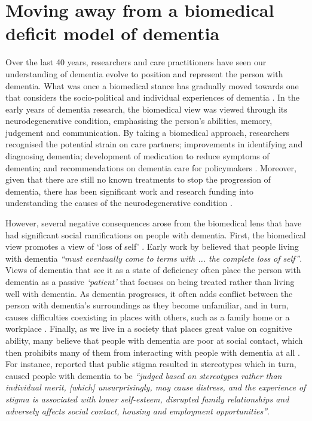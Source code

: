 \section{Moving away from a biomedical deficit model of dementia}
\label{BL:DementiaHCI}
Over the last 40 years, researchers and care practitioners have seen our understanding of dementia evolve to position and represent the person with dementia. What was once a biomedical stance has gradually moved towards one that considers the socio-political and individual experiences of dementia \citep{bellass_broadening_2019}. In the early years of dementia research, the biomedical view was viewed through its neurodegenerative condition, emphasising the person's abilities, memory, judgement and communication. By taking a biomedical approach, researchers recognised the potential strain on care partners; improvements in identifying and diagnosing dementia; development of medication to reduce symptoms of dementia; and recommendations on dementia care for policymakers \citep{doi:10.1080/13607863.2019.1693968}. Moreover, given that there are still no known treatments to stop the progression of dementia, there has been significant work and research funding into understanding the causes of the neurodegenerative condition \citep{bature_signs_2017}.

However, several negative consequences arose from the biomedical lens that have had significant social ramifications on people with dementia. First, the biomedical view promotes a view of `loss of self' \citep{ryan_dementia_2009}. Early work by \cite{cohen_loss_1986} believed that people living with dementia \textit{``must eventually come to terms with ... the complete loss of self''}. Views of dementia that see it as a state of deficiency often place the person with dementia as a passive \textit{`patient'} that focuses on being treated rather than living well with dementia. As dementia progresses, it often adds conflict between the person with dementia's surroundings as they become unfamiliar, and in turn, causes difficulties coexisting in places with others, such as a family home or a workplace \citep{langdon_making_2007}. Finally, as we live in a society that places great value on cognitive ability, many believe that people with dementia are poor at social contact, which then prohibits many of them from interacting with people with dementia at all \citep{killick_communication_2001}. For instance, \cite{mukadam2012reducing} reported that public stigma resulted in stereotypes which in turn, caused people with dementia to be \textit{``judged based on stereotypes rather than individual merit, [which] unsurprisingly, may cause distress, and the experience of stigma is associated with
lower self-esteem, disrupted family relationships
and adversely affects social contact, housing and
employment opportunities''}.

